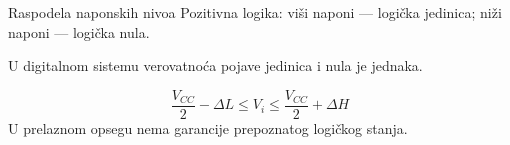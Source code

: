 \begin{frame}[label=08-s011]{Raspodela naponskih nivoa}
Pozitivna logika: viši naponi — logička jedinica; niži naponi — logička nula.\par
U digitalnom sistemu verovatnoća pojave jedinica i nula je jednaka.
\smallskip\par\centering\par\smallskip\raggedright
\[\frac{V_{CC}}2-\Delta L\leq V_i\leq\frac{V_{CC}}2+\Delta H\]
U prelaznom opsegu nema garancije prepoznatog logičkog stanja.
\end{frame}
